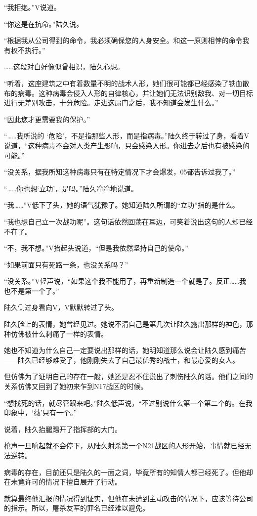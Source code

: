 “我拒绝。”V说道。

“你这是在抗命。”陆久说。

“根据我从公司得到的命令，我必须确保您的人身安全。和这一原则相悖的命令我有权不执行。”

……这段对白好像似曾相识，陆久心想。

“听着，这座建筑之中有着数量不明的战术人形，她们很可能都已经感染了铁血散布的病毒。这种病毒会侵入人形的自律核心，并让她们无法识别敌我、对一切目标进行无差别攻击，十分危险。走进这扇门之后，我不知道会发生什么。”

“因此您才更需要我的保护。”

“……我所说的 ‘危险’，不是指那些人形，而是指病毒。”陆久终于转过了身，看着V说道，“这种病毒不会对人类产生影响，只会感染人形。你进去之后也有被感染的可能。”

“没关系，据我所知这种病毒只有在特定情况下才会爆发，05都告诉过我了。”

“……你也想‘立功’，是吗。”陆久冷冷地说道。

“我……”V低下了头，她的语气犹豫了。她知道陆久所谓的“立功”指的是什么。

“我也想自己立一次战功呢”。这句话依然回荡在耳边，可笑着说出这句的人却已经不在了。

“不，我不想。”V抬起头说道，“但是我依然坚持自己的使命。”

“如果前面只有死路一条，也没关系吗？”

“没关系。”V轻声说，“如果这个我不能用了，再重新制造一个就是了。反正……我也不是第一个了。”

陆久侧过身看向V，V默默转过了头。

陆久脸上的表情，她曾经见过。她说不清自己是第几次让陆久露出那样的神色，那种仿佛被什么刺痛了一样的表情。

她也不知道为什么自己一定要说出那样的话，她明知道那么说会让陆久感到痛苦——陆久已经够难受了，他刚刚失去了自己最优秀的战士，和最心爱的女人。

但仿佛为了证明自己的存在一般，她还是忍不住说出了刺伤陆久的话。他们之间的关系仿佛又回到了她初来乍到N17战区的时候。

“想找死的话，就尽管跟来吧。”陆久低声说，“不过别说什么第一个第二个的。在我印象中，‘薇’只有一个。”

说着，陆久抬腿踢开了指挥部的大门。

枪声一旦响起就不会停下，从陆久射杀第一个N21战区的人形开始，事情就已经无法逆转。

病毒的存在，目前还只是陆久的一面之词，毕竟所有的知情人都已经死了。但他却在未竟许可的情况下擅自展开了行动。

就算最终他汇报的情况得到证实，但他在未遭到主动攻击的情况下，应该等待公司的指示。所以，屠杀友军的罪名已经难以避免。

